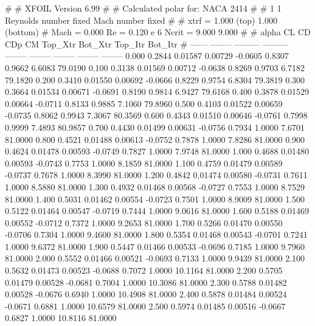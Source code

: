 #  
#       XFOIL         Version 6.99
#  
# Calculated polar for: NACA 2414                                       
#  
# 1 1 Reynolds number fixed          Mach number fixed         
#  
# xtrf =   1.000 (top)        1.000 (bottom)  
# Mach =   0.000     Re =     0.120 e 6     Ncrit =   9.000  9.000
#  
#   alpha    CL        CD       CDp       CM     Top_Xtr  Bot_Xtr  Top_Itr  Bot_Itr
#  ------ -------- --------- --------- -------- -------- -------- -------- --------
   0.000   0.2844   0.01587   0.00729  -0.0605   0.8307   0.9662   6.6083  79.0190
   0.100   0.3138   0.01569   0.00712  -0.0638   0.8269   0.9703   6.7182  79.1820
   0.200   0.3410   0.01550   0.00692  -0.0666   0.8229   0.9754   6.8304  79.3819
   0.300   0.3664   0.01534   0.00671  -0.0691   0.8190   0.9814   6.9427  79.6168
   0.400   0.3878   0.01529   0.00664  -0.0711   0.8133   0.9885   7.1060  79.8960
   0.500   0.4103   0.01522   0.00659  -0.0735   0.8062   0.9943   7.3067  80.3569
   0.600   0.4343   0.01510   0.00646  -0.0761   0.7998   0.9999   7.4893  80.9857
   0.700   0.4430   0.01499   0.00631  -0.0756   0.7934   1.0000   7.6701  81.0000
   0.800   0.4521   0.01488   0.00613  -0.0752   0.7878   1.0000   7.8286  81.0000
   0.900   0.4624   0.01478   0.00593  -0.0749   0.7827   1.0000   7.9748  81.0000
   1.000   0.4688   0.01480   0.00593  -0.0743   0.7753   1.0000   8.1859  81.0000
   1.100   0.4759   0.01479   0.00589  -0.0737   0.7678   1.0000   8.3990  81.0000
   1.200   0.4842   0.01474   0.00580  -0.0731   0.7611   1.0000   8.5880  81.0000
   1.300   0.4932   0.01468   0.00568  -0.0727   0.7553   1.0000   8.7529  81.0000
   1.400   0.5031   0.01462   0.00554  -0.0723   0.7501   1.0000   8.9009  81.0000
   1.500   0.5122   0.01464   0.00547  -0.0719   0.7444   1.0000   9.0616  81.0000
   1.600   0.5188   0.01469   0.00552  -0.0712   0.7372   1.0000   9.2653  81.0000
   1.700   0.5266   0.01470   0.00550  -0.0706   0.7304   1.0000   9.4600  81.0000
   1.800   0.5354   0.01468   0.00543  -0.0701   0.7241   1.0000   9.6372  81.0000
   1.900   0.5447   0.01466   0.00533  -0.0696   0.7185   1.0000   9.7960  81.0000
   2.000   0.5552   0.01466   0.00521  -0.0693   0.7133   1.0000   9.9439  81.0000
   2.100   0.5632   0.01473   0.00523  -0.0688   0.7072   1.0000  10.1164  81.0000
   2.200   0.5705   0.01479   0.00528  -0.0681   0.7004   1.0000  10.3086  81.0000
   2.300   0.5788   0.01482   0.00528  -0.0676   0.6940   1.0000  10.4908  81.0000
   2.400   0.5878   0.01484   0.00524  -0.0671   0.6881   1.0000  10.6579  81.0000
   2.500   0.5974   0.01485   0.00516  -0.0667   0.6827   1.0000  10.8116  81.0000
